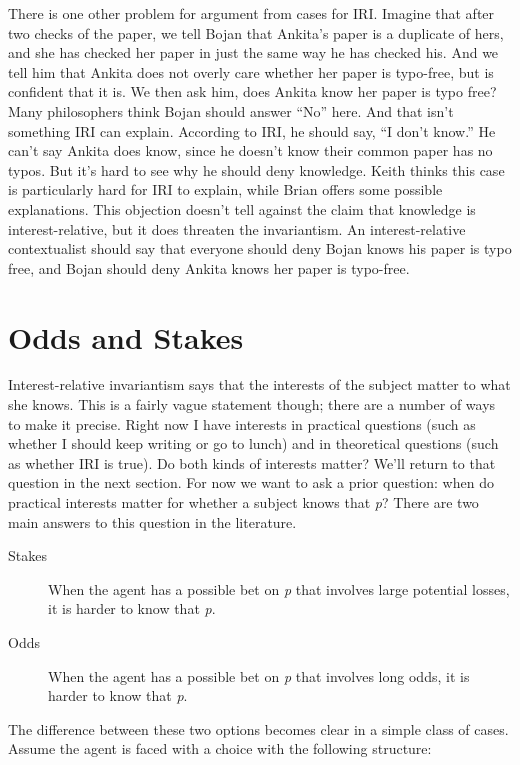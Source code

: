 There is one other problem for argument from cases for IRI. Imagine that after two checks of the paper, we tell Bojan that Ankita's paper is a duplicate of hers, and she has checked her paper in just the same way he has checked his. And we tell him that Ankita does not overly care whether her paper is typo-free, but is confident that it is. We then ask him, does Ankita know her paper is typo free? Many philosophers think Bojan should answer ``No'' here. And that isn't something IRI can explain. According to IRI, he should say, ``I don't know.'' He can't say Ankita does know, since he doesn't know their common paper has no typos. But it's hard to see why he should deny knowledge. Keith  \citet[185]{DeRose2009} thinks this case is particularly hard for IRI to explain, while Brian  \citet{Kim2015} offers some possible explanations. This objection doesn't tell against the claim that knowledge is interest-relative, but it does threaten the invariantism. An interest-relative contextualist should say that everyone should deny Bojan knows his paper is typo free, and Bojan should deny Ankita knows her paper is typo-free.

\section{Odds and Stakes}
\label{oddsandstakes}

Interest-relative invariantism says that the interests of the subject matter to what she knows. This is a fairly vague statement though; there are a number of ways to make it precise. Right now I have interests in practical questions (such as whether I should keep writing or go to lunch) and in theoretical questions (such as whether IRI is true). Do both kinds of interests matter? We'll return to that question in the next section. For now we want to ask a prior question: when do practical interests matter for whether a subject knows that \emph{p}? There are two main answers to this question in the literature.

\begin{description}

\item[Stakes]

When the agent has a possible bet on \emph{p} that involves large potential losses, it is harder to know that \emph{p}.

\item[Odds]

When the agent has a possible bet on \emph{p} that involves long odds, it is harder to know that \emph{p}.
\end{description}
The difference between these two options becomes clear in a simple class of cases. Assume the agent is faced with a choice with the following structure:

